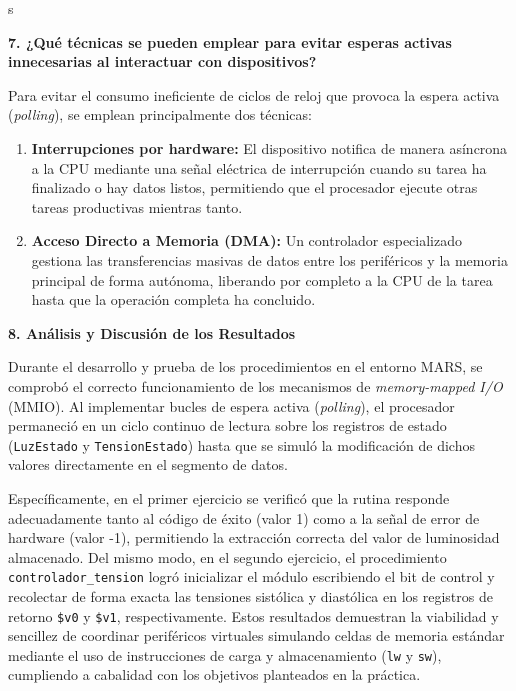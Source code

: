 s\documentclass[11pt,a4paper]{article}
\begin{document}
\vspace{0.4cm}
\noindent\textbf{7. ¿Qué técnicas se pueden emplear para evitar esperas activas innecesarias al interactuar con dispositivos?}

\vspace{0.5cm}
Para evitar el consumo ineficiente de ciclos de reloj que provoca la espera activa (\textit{polling}), se emplean principalmente dos técnicas:
\begin{enumerate}
    \item \textbf{Interrupciones por hardware:} El dispositivo notifica de manera asíncrona a la CPU mediante una señal eléctrica de interrupción cuando su tarea ha finalizado o hay datos listos, permitiendo que el procesador ejecute otras tareas productivas mientras tanto.
    \item \textbf{Acceso Directo a Memoria (DMA):} Un controlador especializado gestiona las transferencias masivas de datos entre los periféricos y la memoria principal de forma autónoma, liberando por completo a la CPU de la tarea hasta que la operación completa ha concluido.
\end{enumerate}

\vspace{0.4cm}
\noindent\textbf{8. Análisis y Discusión de los Resultados}

\vspace{0.5cm}
Durante el desarrollo y prueba de los procedimientos en el entorno MARS, se comprobó el correcto funcionamiento de los mecanismos de \textit{memory-mapped I/O} (MMIO). Al implementar bucles de espera activa (\textit{polling}), el procesador permaneció en un ciclo continuo de lectura sobre los registros de estado (\texttt{LuzEstado} y \texttt{TensionEstado}) hasta que se simuló la modificación de dichos valores directamente en el segmento de datos. 

Específicamente, en el primer ejercicio se verificó que la rutina responde adecuadamente tanto al código de éxito (valor 1) como a la señal de error de hardware (valor -1), permitiendo la extracción correcta del valor de luminosidad almacenado. Del mismo modo, en el segundo ejercicio, el procedimiento \texttt{controlador\_tension} logró inicializar el módulo escribiendo el bit de control y recolectar de forma exacta las tensiones sistólica y diastólica en los registros de retorno \texttt{\$v0} y \texttt{\$v1}, respectivamente. Estos resultados demuestran la viabilidad y sencillez de coordinar periféricos virtuales simulando celdas de memoria estándar mediante el uso de instrucciones de carga y almacenamiento (\texttt{lw} y \texttt{sw}), cumpliendo a cabalidad con los objetivos planteados en la práctica.
\end{document}
